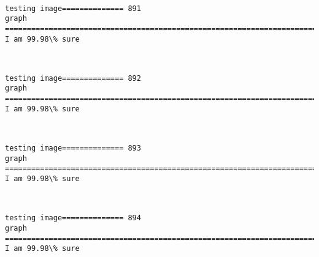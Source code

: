 \documentclass[11pt]{article}
\begin{document}
    \begin{center}
    \end{center}
    { \hspace*{\fill} \\}
    
    \begin{Verbatim}[commandchars=\\\{\}]
testing image============== 891
graph
============================================================================
I am 99.98\% sure

    \end{Verbatim}

    \begin{center}
    \end{center}
    { \hspace*{\fill} \\}
    
    \begin{Verbatim}[commandchars=\\\{\}]
testing image============== 892
graph
============================================================================
I am 99.98\% sure

    \end{Verbatim}

    \begin{center}
    \end{center}
    { \hspace*{\fill} \\}
    
    \begin{Verbatim}[commandchars=\\\{\}]
testing image============== 893
graph
============================================================================
I am 99.98\% sure

    \end{Verbatim}

    \begin{center}
    \end{center}
    { \hspace*{\fill} \\}
    
    \begin{Verbatim}[commandchars=\\\{\}]
testing image============== 894
graph
============================================================================
I am 99.98\% sure

    \end{Verbatim}
\end{document}
